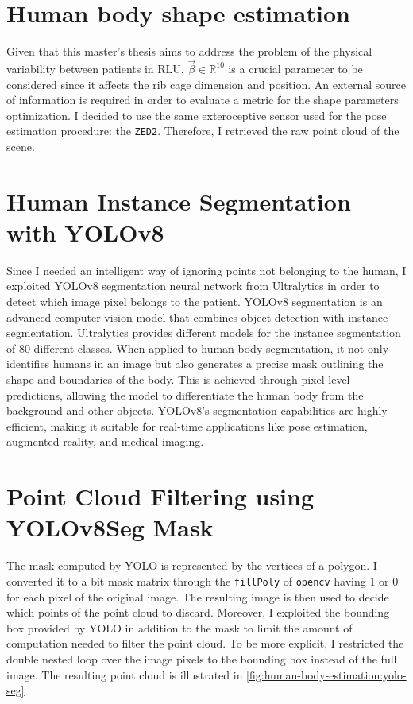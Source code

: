 \section{Human body shape estimation}
\label{section:human-body-shape-estimation}
Given that this master's thesis aims to address the problem of the physical variability between patients in RLU, $\vec{\beta} \in \mathbb{R}^{10}$ is a crucial parameter to be considered since it affects the rib cage dimension and position. An external source of information is required in order to evaluate a metric for the shape parameters optimization. I decided to use the same exteroceptive sensor used for the pose estimation procedure: the \verb|ZED2|. Therefore, I retrieved the raw point cloud of the scene. 

\section{Human Instance Segmentation with YOLOv8}
Since I needed an intelligent way of ignoring points not belonging to the human, I exploited YOLOv8 segmentation neural network from Ultralytics in order to detect which image pixel belongs to the patient. YOLOv8 segmentation is an advanced computer vision model that combines object detection with instance segmentation. Ultralytics provides different models for the instance segmentation of 80 different classes. 
When applied to human body segmentation, it not only identifies humans in an image but also generates a precise mask outlining the shape and boundaries of the body. This is achieved through pixel-level predictions, allowing the model to differentiate the human body from the background and other objects. YOLOv8's segmentation capabilities are highly efficient, making it suitable for real-time applications like pose estimation, augmented reality, and medical imaging.  

\section{Point Cloud Filtering using YOLOv8Seg Mask}
The mask computed by YOLO is represented by the vertices of a polygon. I converted it to a bit mask matrix through the \verb|fillPoly| of \verb|opencv| having 1 or 0 for each pixel of the original image. The resulting image is then used to decide which points of the point cloud to discard. Moreover, I exploited the bounding box provided by YOLO in addition to the mask to limit the amount of computation needed to filter the point cloud. To be more explicit, I restricted the double nested loop over the image pixels to the bounding box instead of the full image. The resulting point cloud is illustrated in \autoref{fig:human-body-estimation:yolo-seg}


